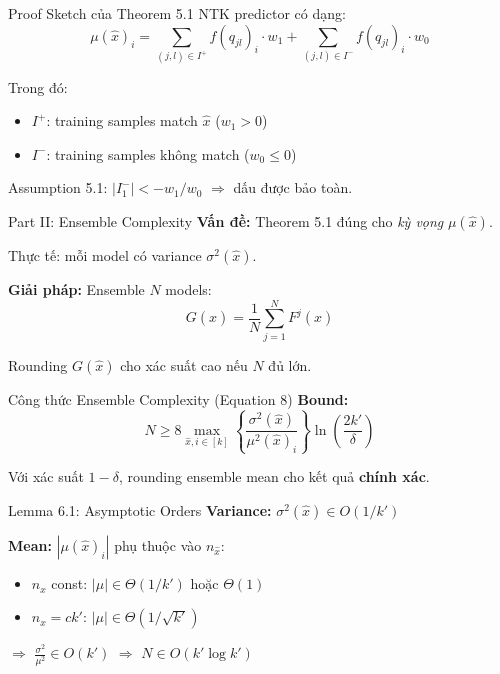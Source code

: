 \begin{frame}{Proof Sketch của Theorem 5.1}
  NTK predictor có dạng:
  \[
    \mu(\hat{x})_i = \sum_{(j,l) \in I^+} f(q_{jl})_i \cdot w_1 + \sum_{(j,l) \in I^-} f(q_{jl})_i \cdot w_0
  \]
  
  Trong đó:
  \begin{itemize}
    \item $I^+$: training samples match $\hat{x}$ ($w_1 > 0$)
    \item $I^-$: training samples không match ($w_0 \le 0$)
  \end{itemize}
  
  \vspace{0.2cm}
  Assumption 5.1: $|I^-_1| < -w_1/w_0$ $\Rightarrow$ dấu được bảo toàn.
\end{frame}

\begin{frame}{Part II: Ensemble Complexity}
  \textbf{Vấn đề:} Theorem 5.1 đúng cho \emph{kỳ vọng} $\mu(\hat{x})$.
  
  Thực tế: mỗi model có variance $\sigma^2(\hat{x})$.

  \vspace{0.3cm}
  \textbf{Giải pháp:} Ensemble $N$ models:
  \[
    G(\hat{x}) = \frac{1}{N}\sum_{j=1}^N F^j(\hat{x})
  \]
  
  Rounding $G(\hat{x})$ cho xác suất cao nếu $N$ đủ lớn.
\end{frame}

\begin{frame}{Công thức Ensemble Complexity (Equation 8)}
  \textbf{Bound:}
  \[
    \boxed{N \ge 8 \max_{\hat{x}, i \in [k]} \left\{ \frac{\sigma^2(\hat{x})}{\mu^2(\hat{x})_i} \right\} \ln\left(\frac{2k'}{\delta}\right)}
  \]

  Với xác suất $1 - \delta$, rounding ensemble mean cho kết quả \textbf{chính xác}.
\end{frame}

\begin{frame}{Lemma 6.1: Asymptotic Orders}
  \textbf{Variance:} $\sigma^2(\hat{x}) \in O(1/k')$
  
  \textbf{Mean:} $|\mu(\hat{x})_i|$ phụ thuộc vào $n_{\hat{x}}$:
  \begin{itemize}
    \item $n_{\hat{x}}$ const: $|\mu| \in \Theta(1/k')$ hoặc $\Theta(1)$
    \item $n_{\hat{x}} = ck'$: $|\mu| \in \Theta(1/\sqrt{k'})$
  \end{itemize}
  
  \vspace{0.3cm}
  $\Rightarrow$ $\frac{\sigma^2}{\mu^2} \in O(k')$ $\Rightarrow$ $N \in O(k' \log k')$
\end{frame}

